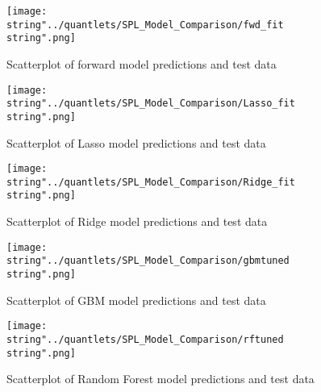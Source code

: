 \begin{figure}[H]
\centering
	\texttt{[image: \\string"../quantlets/SPL\_Model\_Comparison/fwd\_fit\\string".png]}
  	\caption{Scatterplot of forward model predictions and test data}
  	\label{fig:fwd}
\end{figure}

\begin{figure}[H]
\centering
	\texttt{[image: \\string"../quantlets/SPL\_Model\_Comparison/Lasso\_fit\\string".png]}
  	\caption{Scatterplot of Lasso model predictions and test data}
  	\label{fig:Lasso}
\end{figure}

\begin{figure}[H]
\centering
	\texttt{[image: \\string"../quantlets/SPL\_Model\_Comparison/Ridge\_fit\\string".png]}
  	\caption{Scatterplot of Ridge model predictions and test data}
  	\label{fig:Ridge}
\end{figure}

\begin{figure}[H]
\centering
	\texttt{[image: \\string"../quantlets/SPL\_Model\_Comparison/gbmtuned\\string".png]}
  	\caption{Scatterplot of GBM model predictions and test data}
  	\label{fig:gbm}
\end{figure}

\begin{figure}[H]
\centering
	\texttt{[image: \\string"../quantlets/SPL\_Model\_Comparison/rftuned\\string".png]}
  	\caption{Scatterplot of Random Forest model predictions and test data}
  	\label{fig:rf}
\end{figure}



